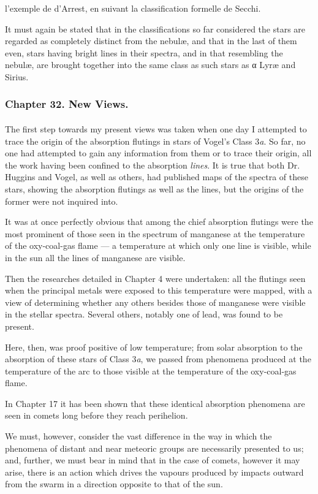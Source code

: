 \documentclass[a4paper, 12pt, oneside, polutonikogreek, english]{article}
\begin{document}
l'exemple de d'Arrest, en suivant la classification formelle de Secchi.

It must again be stated that in the classifications so far considered the stars are regarded as completely distinct from the nebulæ, and that in the last of them even, stars having bright lines in their spectra, and in that resembling the nebulæ, are brought together into the same class as such stars as α Lyræ and Sirius.
\clearpage
\subsubsection{Chapter 32. New Views.}
\paragraph{}
The first step towards my present views was taken when one day I attempted to trace the origin of the absorption flutings in stars of Vogel's Class 3\emph{a}. So far, no one had attempted to gain any information from them or to trace their origin, all the work having been confined to the absorption \emph{lines}. It is true that both Dr. Huggins and Vogel, as well as others, had published maps of the spectra of these stars, showing the absorption flutings as well as the lines, but the origins of the former were not inquired into.

It was at once perfectly obvious that among the chief absorption flutings were the most prominent of those seen in the spectrum of manganese at the temperature of the oxy-coal-gas flame --- a temperature at which only one line is visible, while in the sun all the lines of manganese are visible.

Then the researches detailed in Chapter 4 were undertaken: all the flutings seen when the principal metals were exposed to this temperature were mapped, with a view of determining whether any others besides those of manganese were visible in the stellar spectra. Several others, notably one of lead, was found to be present.

Here, then, was proof positive of low temperature; from solar absorption to the absorption of these stars of Class 3\emph{a}, we passed from phenomena produced at the temperature of the arc to those visible at the temperature of the oxy-coal-gas flame.

In Chapter 17 it has been shown that these identical absorption phenomena are seen in comets long before they reach perihelion.

We must, however, consider the vast difference in the way in which the phenomena of distant and near meteoric groups are necessarily presented to us; and, further, we must bear in mind that in the case of comets, however it may arise, there is an action which drives the vapours produced by impacts outward from the swarm in a direction opposite to that of the sun.
\end{document}
